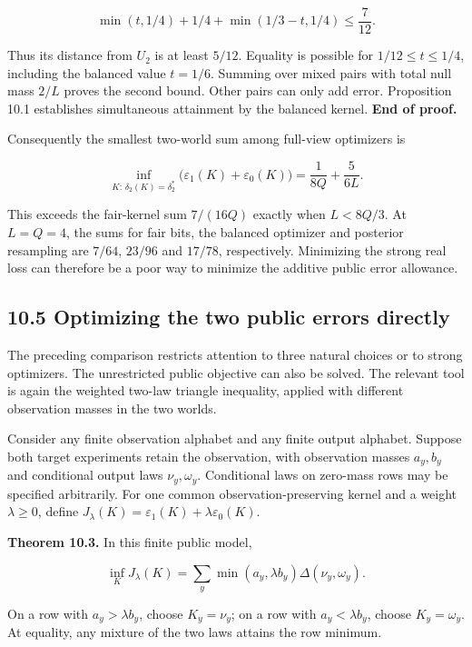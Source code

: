 \documentclass[
]{article}
\begin{document}
\[
\min(t,1/4)+1/4+\min(1/3-t,1/4)\le\frac7{12}.
\]

Thus its distance from \(U_2\) is at least \(5/12\). Equality is
possible for \(1/12\le t\le1/4\), including the balanced value
\(t=1/6\). Summing over mixed pairs with total null mass \(2/L\) proves
the second bound. Other pairs can only add error. Proposition 10.1
establishes simultaneous attainment by the balanced kernel. \textbf{End
of proof.}

Consequently the smallest two-world sum among full-view optimizers is

\[
\inf_{K:\,\delta_2(K)=\delta_2^*}
\bigl(\varepsilon_1(K)+\varepsilon_0(K)\bigr)
=\frac1{8Q}+\frac5{6L}.
\]

This exceeds the fair-kernel sum \(7/(16Q)\) exactly when \(L<8Q/3\). At
\(L=Q=4\), the sums for fair bits, the balanced optimizer and posterior
resampling are \(7/64\), \(23/96\) and \(17/78\), respectively.
Minimizing the strong real loss can therefore be a poor way to minimize
the additive public error allowance.

\subsection{10.5 Optimizing the two public errors
directly}\label{optimizing-the-two-public-errors-directly}

The preceding comparison restricts attention to three natural choices or
to strong optimizers. The unrestricted public objective can also be
solved. The relevant tool is again the weighted two-law triangle
inequality, applied with different observation masses in the two worlds.

Consider any finite observation alphabet and any finite output alphabet.
Suppose both target experiments retain the observation, with observation
masses \(a_y,b_y\) and conditional output laws \(\nu_y,\omega_y\).
Conditional laws on zero-mass rows may be specified arbitrarily. For one
common observation-preserving kernel and a weight \(\lambda\ge0\),
define \(J_\lambda(K)=\varepsilon_1(K)+\lambda\varepsilon_0(K)\).

\textbf{Theorem 10.3.} In this finite public model,

\[
\inf_K J_\lambda(K)
=\sum_y\min(a_y,\lambda b_y)\Delta(\nu_y,\omega_y).
\]

On a row with \(a_y>\lambda b_y\), choose \(K_y=\nu_y\); on a row with
\(a_y<\lambda b_y\), choose \(K_y=\omega_y\). At equality, any mixture
of the two laws attains the row minimum.
\end{document}
